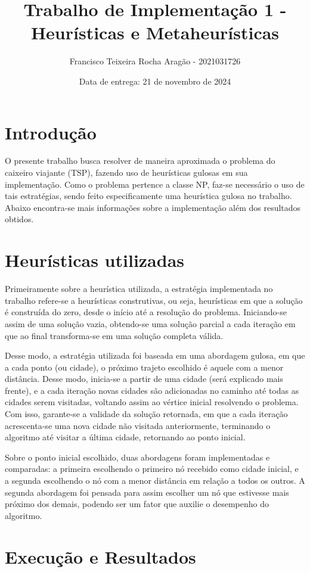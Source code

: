 \documentclass[10pt]{extarticle} %
\title{Trabalho de Implementação 1 - Heurísticas e Metaheurísticas}
\author{Francisco Teixeira Rocha Aragão - 2021031726}
\date{Data de entrega: 21 de novembro de 2024}
\begin{document}
\maketitle

\section{Introdução}

O presente trabalho busca resolver de maneira aproximada o problema do caixeiro viajante (TSP), fazendo uso de heurísticas gulosas em sua implementação. Como o problema pertence a classe NP, faz-se necessário o uso de tais estratégias, sendo feito especificamente uma heurística gulosa no trabalho. Abaixo encontra-se mais informações sobre a implementação além dos resultados obtidos.

\section{Heurísticas utilizadas}

Primeiramente sobre a heurística utilizada, a estratégia implementada no trabalho refere-se a heurísticas construtivas, ou seja, heurísticas em que a solução é construída do zero, desde o início até a resolução do problema. Iniciando-se assim de uma solução vazia, obtendo-se uma solução parcial a cada iteração em que ao final transforma-se em uma solução completa válida.

Desse modo, a estratégia utilizada foi baseada em uma abordagem gulosa, em que a cada ponto (ou cidade), o próximo trajeto escolhido é aquele com a menor distância. Desse modo, inicia-se a partir de uma cidade (será explicado mais frente), e a cada iteração novas cidades são adicionadas no caminho até todas as cidades serem visitadas, voltando assim ao vértice inicial resolvendo o problema. Com isso, garante-se a validade da solução retornada, em que a cada iteração acrescenta-se uma nova cidade não visitada anteriormente, terminando o algoritmo até visitar a última cidade, retornando ao ponto inicial.

Sobre o ponto inicial escolhido, duas abordagens foram implementadas e comparadas: a primeira escolhendo o primeiro nó recebido como cidade inicial, e a segunda escolhendo o nó com a menor distância em relação a todos os outros. A segunda abordagem foi pensada para assim escolher um nó que estivesse mais próximo dos demais, podendo ser um fator que auxilie o desempenho do algoritmo. 

\section{Execução e Resultados}
\end{document}
